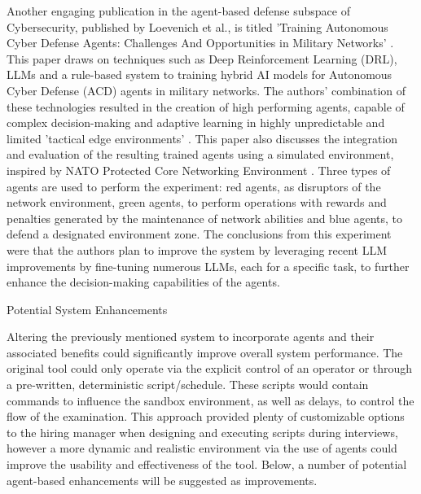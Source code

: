 \documentclass[a4paper,9pt]{scrartcl}
\makeatletter
\renewcommand{\subsection}{\@startsection{subsection}{2}{0mm}
  {0.25\baselineskip} 
  {0.25\baselineskip} 
  {\normalfont\normalsize\bfseries}}
\makeatother
\begin{document}
Another engaging publication in the agent-based defense subspace of Cybersecurity, published by
Loevenich et al., is titled 'Training Autonomous Cyber Defense Agents: Challenges And Opportunities
in Military Networks' \cite{loevenichTrainingAutonomousCyber2024}. This paper draws on techniques 
such as Deep Reinforcement Learning (DRL), LLMs and a rule-based system to training hybrid AI models
for Autonomous Cyber Defense (ACD) agents in military networks. The authors' combination of these 
technologies resulted in the creation of high performing agents, capable of complex decision-making
and adaptive learning in highly unpredictable and limited 'tactical edge environments' 
\cite{loevenichTrainingAutonomousCyber2024}. This paper also discusses the integration and evaluation 
of the resulting trained agents using a simulated environment, inspired by NATO Protected Core Networking
Environment \cite{loevenichTrainingAutonomousCyber2024}. Three types of agents are used 
to perform the experiment: red agents, as disruptors of the network environment, green agents, to perform 
operations with rewards and penalties generated by the maintenance of network abilities and blue 
agents, to defend a designated environment zone. The conclusions from this experiment were that the authors 
plan to improve the system by leveraging recent LLM improvements by fine-tuning numerous LLMs, each for a specific 
task, to further enhance the decision-making capabilities of the agents.



\subsection{Potential System Enhancements}

Altering the previously mentioned system to incorporate agents and their associated
benefits could significantly improve overall system performance. The original tool 
could only operate via the explicit control of an operator
or through a pre-written, deterministic script/schedule. These scripts would 
contain commands to influence the sandbox environment, as well as delays, to control 
the flow of the examination. This approach provided plenty of customizable options 
to the hiring manager when designing and executing scripts during interviews, however
a more dynamic and realistic environment via the use of agents could improve the 
usability and effectiveness of the tool. Below, a number of potential agent-based 
enhancements will be suggested as improvements.
\end{document}
